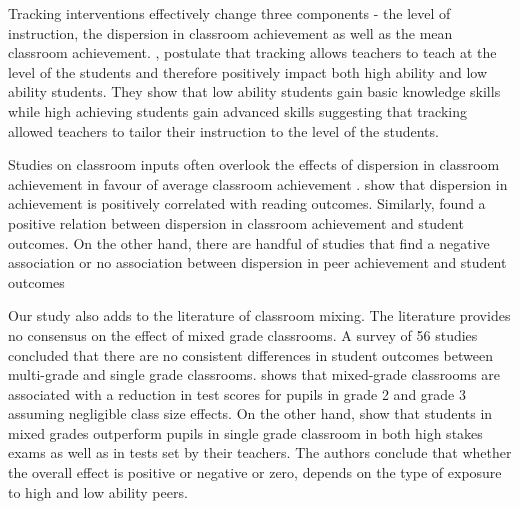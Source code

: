 \documentclass[12pt]{article}
\begin{document}
Tracking interventions effectively change three components - the level of instruction, the dispersion in classroom achievement as well as the mean classroom achievement.  \cite{duflodupaskremer}, postulate that tracking allows teachers to teach at the level of the students and therefore positively impact both high ability and low ability students. They show that low ability students gain basic knowledge skills while high achieving students gain advanced skills suggesting that tracking allowed teachers to tailor their instruction to the level of the students.   

Studies on classroom inputs often overlook the effects of dispersion in classroom achievement in favour of average classroom achievement \citep{rjosk2022dispersion}. \cite{kuzmina2018effects} show that dispersion in achievement is positively correlated with reading outcomes. Similarly, \cite{vigdor2007peer} found a positive relation between dispersion in classroom achievement and student outcomes. On the other hand, there are handful of studies that find a negative association  \citep{duflo2011peer, ding2007peers} or no association \citep{hanushek2003does} between dispersion in peer achievement and student outcomes


Our study also adds to the literature of classroom mixing. The literature provides no consensus on the effect of mixed grade classrooms. A survey of 56 studies concluded that there are no consistent differences in student outcomes between multi-grade and single grade classrooms.  \cite{sims2008strategic} shows that mixed-grade classrooms are associated with a reduction in test scores for pupils in grade 2 and grade 3 assuming negligible class size effects. On the other hand, \cite{leuven2011classroom} show that students in mixed grades outperform pupils in single grade classroom in both high stakes exams as well as in tests set by their teachers. The authors conclude that whether the overall effect is positive or negative or zero, depends on the type of exposure to high and low ability peers. 
\end{document}
